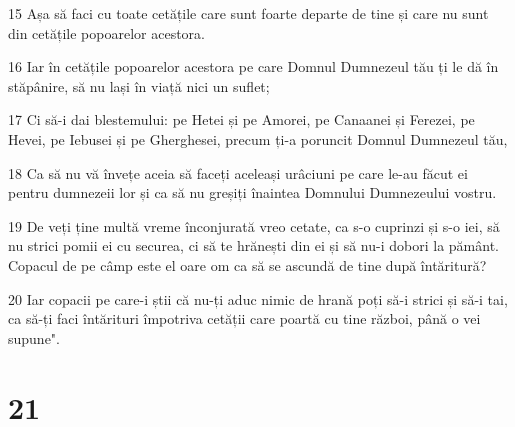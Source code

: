 \par 15 Așa să faci cu toate cetățile care sunt foarte departe de tine și care nu sunt din cetățile popoarelor acestora.
\par 16 Iar în cetățile popoarelor acestora pe care Domnul Dumnezeul tău ți le dă în stăpânire, să nu lași în viață nici un suflet;
\par 17 Ci să-i dai blestemului: pe Hetei și pe Amorei, pe Canaanei și Ferezei, pe Hevei, pe Iebusei și pe Gherghesei, precum ți-a poruncit Domnul Dumnezeul tău,
\par 18 Ca să nu vă învețe aceia să faceți aceleași urâciuni pe care le-au făcut ei pentru dumnezeii lor și ca să nu greșiți înaintea Domnului Dumnezeului vostru.
\par 19 De veți ține multă vreme înconjurată vreo cetate, ca s-o cuprinzi și s-o iei, să nu strici pomii ei cu securea, ci să te hrănești din ei și să nu-i dobori la pământ. Copacul de pe câmp este el oare om ca să se ascundă de tine după întăritură?
\par 20 Iar copacii pe care-i știi că nu-ți aduc nimic de hrană poți să-i strici și să-i tai, ca să-ți faci întărituri împotriva cetății care poartă cu tine război, până o vei supune".

\chapter{21}

